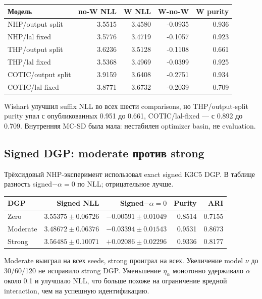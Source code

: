 \documentclass[11pt,a4paper]{article}
\begin{document}
\begin{center}
\small
\begin{tabular}{lrrrr}
\toprule
Модель & no-W NLL & W NLL & W-no-W & W purity \\
\midrule
NHP/output split & 3.5515 & 3.4580 & -0.0935 & 0.936 \\
NHP/lal fixed & 3.5776 & 3.4719 & -0.1057 & 0.923 \\
THP/output split & 3.6236 & 3.5128 & -0.1108 & 0.661 \\
THP/lal fixed & 3.5368 & 3.4969 & -0.0399 & 0.925 \\
COTIC/output split & 3.9159 & 3.6408 & -0.2751 & 0.934 \\
COTIC/lal fixed & 3.8771 & 3.6732 & -0.2039 & 0.709 \\
\bottomrule
\end{tabular}
\end{center}

Wishart улучшил suffix NLL во всех шести comparisons, но THP/output-split
purity упал с опубликованных 0.951 до 0.661, COTIC/lal-fixed --- с 0.892 до
0.709. Внутренняя MC-SD была мала: нестабилен optimizer basin, не evaluation.

\subsection{Signed DGP: moderate против strong}

Трёхсидовый NHP-эксперимент использовал exact signed K3C5 DGP. В таблице
разность signed$-\alpha=0$ по NLL; отрицательное лучше.

\begin{center}
\begin{tabular}{lrrrr}
\toprule
DGP & Signed NLL & Signed$-\alpha=0$ & Purity & ARI \\
\midrule
Zero & $3.55375\pm0.06726$ & $-0.00591\pm0.01049$ & 0.8514 & 0.7155 \\
Moderate & $3.48672\pm0.06376$ & $-0.03394\pm0.01543$ & 0.9531 & 0.8673 \\
Strong & $3.56485\pm0.10071$ & $+0.02086\pm0.02296$ & 0.9336 & 0.8177 \\
\bottomrule
\end{tabular}
\end{center}

Moderate выиграл на всех seeds, strong проиграл на всех. Увеличение model $\nu$
до 30/60/120 не исправило strong DGP. Уменьшение $\eta_\alpha$ монотонно
удерживало $\alpha$ около 0.1 и улучшало NLL, что больше похоже на ограничение
вредной interaction, чем на успешную идентификацию.
\end{document}
